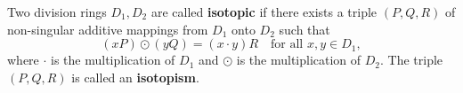 Two division rings $D_1, D_2$ are called \textbf{isotopic} if there exists a triple $(P, Q, R)$ of non-singular additive mappings from $D_1$ onto $D_2$ such that
$$(xP) \odot (yQ) = (x \cdot y)R \quad \text{for all } x, y \in D_1,$$
where $\cdot$ is the multiplication of $D_1$ and $\odot$ is the multiplication of $D_2$. The triple $(P, Q, R)$ is called an \textbf{isotopism}.
